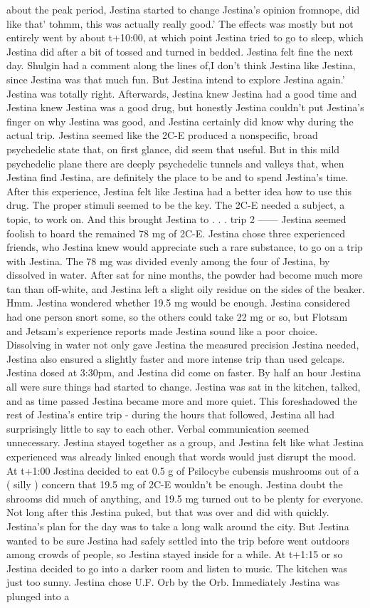 \documentclass[12pt]{book}
\begin{document}
about the peak period, Jestina started to change Jestina's opinion fromnope, did like that' tohmm, this was actually really good.' The effects was mostly but not entirely went by about t+10:00, at which point Jestina tried to go to sleep, which Jestina did after a bit of tossed and turned in bedded. Jestina felt fine the next day. Shulgin had a comment along the lines of,I don't think Jestina like Jestina, since Jestina was that much fun. But Jestina intend to explore Jestina again.' Jestina was totally right. Afterwards, Jestina knew Jestina had a good time and Jestina knew Jestina was a good drug, but honestly Jestina couldn't put Jestina's finger on why Jestina was good, and Jestina certainly did know why during the actual trip. Jestina seemed like the 2C-E produced a nonspecific, broad psychedelic state that, on first glance, did seem that useful. But in this mild psychedelic plane there are deeply psychedelic tunnels and valleys that, when Jestina find Jestina, are definitely the place to be and to spend Jestina's time. After this experience, Jestina felt like Jestina had a better idea how to use this drug. The proper stimuli seemed to be the key. The 2C-E needed a subject, a topic, to work on. And this brought Jestina to . . .  trip 2 ------ Jestina seemed foolish to hoard the remained 78 mg of 2C-E. Jestina chose three experienced friends, who Jestina knew would appreciate such a rare substance, to go on a trip with Jestina. The 78 mg was divided evenly among the four of Jestina, by dissolved in water. After sat for nine months, the powder had become much more tan than off-white, and Jestina left a slight oily residue on the sides of the beaker. Hmm. Jestina wondered whether 19.5 mg would be enough. Jestina considered had one person snort some, so the others could take 22 mg or so, but Flotsam and Jetsam's experience reports made Jestina sound like a poor choice. Dissolving in water not only gave Jestina the measured precision Jestina needed, Jestina also ensured a slightly faster and more intense trip than used gelcaps. Jestina dosed at 3:30pm, and Jestina did come on faster. By half an hour Jestina all were sure things had started to change. Jestina was sat in the kitchen, talked, and as time passed Jestina became more and more quiet. This foreshadowed the rest of Jestina's entire trip - during the hours that followed, Jestina all had surprisingly little to say to each other. Verbal communication seemed unnecessary. Jestina stayed together as a group, and Jestina felt like what Jestina experienced was already linked enough that words would just disrupt the mood. At t+1:00 Jestina decided to eat 0.5 g of Psilocybe cubensis mushrooms out of a ( silly ) concern that 19.5 mg of 2C-E wouldn't be enough. Jestina doubt the shrooms did much of anything, and 19.5 mg turned out to be plenty for everyone. Not long after this Jestina puked, but that was over and did with quickly. Jestina's plan for the day was to take a long walk around the city. But Jestina wanted to be sure Jestina had safely settled into the trip before went outdoors among crowds of people, so Jestina stayed inside for a while. At t+1:15 or so Jestina decided to go into a darker room and listen to music. The kitchen was just too sunny. Jestina chose U.F. Orb by the Orb. Immediately Jestina was plunged into a 
\end{document}
